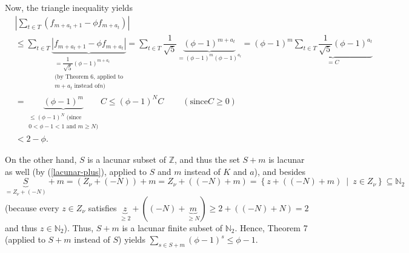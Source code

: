 \documentclass[12pt,final,notitlepage,onecolumn]{article}%
\begin{document}
Now, the triangle inequality yields%
\begin{align*}
&  \left\vert \sum\limits_{t\in T}\left(  f_{m+a_{t}+1}-\phi f_{m+a_{t}%
}\right)  \right\vert \\
&  \leq\sum\limits_{t\in T}\underbrace{\left\vert f_{m+a_{t}+1}-\phi
f_{m+a_{t}}\right\vert }_{\substack{=\dfrac{1}{\sqrt{5}}\left(  \phi-1\right)
^{m+a_{t}}\\\text{(by Theorem 6, applied to}\\m+a_{t}\text{ instead of
}n\text{)}}}=\sum\limits_{t\in T}\dfrac{1}{\sqrt{5}}\underbrace{\left(
\phi-1\right)  ^{m+a_{t}}}_{=\left(  \phi-1\right)  ^{m}\left(  \phi-1\right)
^{a_{t}}}=\left(  \phi-1\right)  ^{m}\underbrace{\sum\limits_{t\in T}\dfrac
{1}{\sqrt{5}}\left(  \phi-1\right)  ^{a_{t}}}_{=C}\\
&  =\underbrace{\left(  \phi-1\right)  ^{m}}_{\substack{\leq\left(
\phi-1\right)  ^{N}\text{ (since}\\0<\phi-1<1\text{ and }m\geq N\text{)}%
}}C\leq\left(  \phi-1\right)  ^{N}C\ \ \ \ \ \ \ \ \ \ \left(  \text{since
}C\geq0\right) \\
&  <2-\phi.
\end{align*}


On the other hand, $S$ is a lacunar subset of $\mathbb{Z}$, and thus the set
$S+m$ is lacunar as well (by (\ref{lacunar-plus}), applied to $S$ and $m$ instead
of $K$ and $a$), and besides $\underbrace{S}_{=Z_{\nu}+\left(  -N\right)
}+m=\left(  Z_{\nu}+\left(  -N\right)  \right)  +m=Z_{\nu}+\left(  \left(
-N\right)  +m\right)  =\left\{  z+\left(  \left(  -N\right)  +m\right)
\ \mid\ z\in Z_{\nu}\right\}  \subseteq\mathbb{N}_{2}$ (because every $z\in
Z_{\nu}$ satisfies $\underbrace{z}_{\geq2}+\left(  \left(  -N\right)
+\underbrace{m}_{\geq N}\right)  \geq2+\left(  \left(  -N\right)  +N\right)
=2$ and thus $z\in\mathbb{N}_{2}$). Thus, $S+m$ is a lacunar finite subset of
$\mathbb{N}_{2}$. Hence, Theorem 7 (applied to $S+m$ instead of $S$) yields
$\sum\limits_{s\in S+m}\left(  \phi-1\right)  ^{s}\leq\phi-1$.
\end{document}
